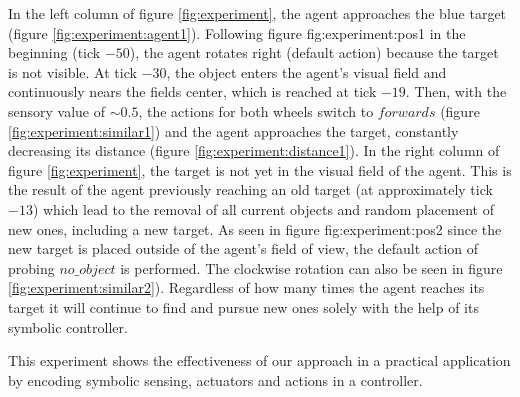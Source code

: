 \documentclass[a4paper,twoside]{article}
\begin{document}
In the left column of figure \ref{fig:experiment}, the agent approaches the blue
target (figure \ref{fig:experiment:agent1}). Following figure {fig:experiment:pos1} in the beginning (tick $-50$), the
agent rotates right (default action) because the target is not visible.
At tick $-30$, the object enters the agent's visual field and continuously nears the fields center, which is reached at tick $-19$.
Then, with the sensory value of ${\sim}0.5$, the actions for both wheels switch
to $forwards$ (figure \ref{fig:experiment:similar1}) and the agent approaches
the target, constantly decreasing its distance
(figure \ref{fig:experiment:distance1}). In the right column of figure \ref{fig:experiment}, the target is not yet
in the visual field of the agent.
This is the result of the agent previously reaching an old target (at approximately tick $-13$) which lead
to the removal of all current objects and random placement of new ones,
including a new target.
As seen in figure {fig:experiment:pos2} since the new target is placed outside of the agent's field of view, the default
action of probing $no\_object$ is performed. The
clockwise rotation can also be seen in figure \ref{fig:experiment:similar2}). Regardless of how many times the agent reaches its target it will continue to find and pursue new ones solely with the help of its symbolic controller.

This experiment shows the effectiveness of our approach in a practical
application by encoding symbolic sensing, actuators and actions in a
controller.
\end{document}
